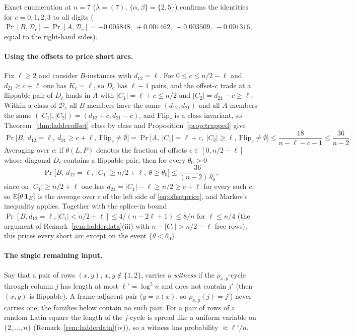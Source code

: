 Exact enumeration at $n=7$ ($\lambda=(7)$, $\{\alpha,\beta\}=\{2,5\}$)
confirms the identities for $c=0,1,2,3$ to all digits
($\Pr[B,\mathcal D_c]-\Pr[A,\mathcal D_c]=-0.005848,\ +0.001462,\
+0.003509,\ -0.001316$, equal to the right-hand sides).

\paragraph{Using the offsets to price short arcs.}  Fix $\ell\ge2$ and
consider $B$-instances with $d_{12}=\ell$.  For $0\le c\le n/2-\ell$
and $d_{21}\ge c+\ell$ one has $K_c=\ell$, so $D_c$ has $\ell-1$ pairs,
and the offset-$c$ trade at a flippable pair of $D_c$ lands in $A$
with $|C_1|=\ell+c\le n/2$ and $|C_2|=d_{21}-c\ge\ell$.  Within a
class of $\mathcal D_c$ all $B$-members have the same $(d_{12},d_{21})$
and all $A$-members the same $(|C_1|,|C_2|)=(d_{12}+c,d_{21}-c)$, and
$\mathrm{Flip}_c$ is a class invariant, so Theorem~\ref{thm:ladderoffset}
class by class and Proposition~\ref{prop:trapped} give
\begin{equation}\label{eq:offsetprice}
\Pr\bigl[B,\ d_{12}=\ell,\ d_{21}\ge c+\ell,\ \mathrm{Flip}_c\ne\emptyset\bigr]
=\Pr\bigl[A,\ |C_1|=\ell+c,\ |C_2|\ge\ell,\ \mathrm{Flip}_c\ne\emptyset\bigr]
\le\frac{18}{n-\ell-c-1}\le\frac{36}{n-2}.
\end{equation}
Averaging over $c$: if $\theta(L,P)$ denotes the fraction of offsets
$c\in[0,n/2-\ell]$ whose diagonal $D_c$ contains a flippable pair,
then for every $\theta_0>0$
\begin{equation}\label{eq:offsetavg}
\Pr\bigl[B,\ d_{12}=\ell,\ |C_1|\ge n/2+\ell,\ \theta\ge\theta_0\bigr]\le\frac{36}{(n-2)\,\theta_0},
\end{equation}
since on $|C_1|\ge n/2+\ell$ one has $d_{21}=|C_1|-\ell\ge n/2\ge c+\ell$
for every such $c$, so $\mathbb{E}[\theta\,\mathbf 1_E]$ is the average over
$c$ of the left side of \eqref{eq:offsetprice}, and Markov's
inequality applies.  Together with the splice-in bound
$\Pr[B,d_{12}=\ell,|C_1|<n/2+\ell]\le4/(n-2\ell+1)\le8/n$ for
$\ell\le n/4$ (the argument of Remark~\ref{rem:ladderdata}(iii) with
$n-|C_1|>n/2-\ell$ free rows), this prices every short arc except on
the event $\{\theta<\theta_0\}$.

\paragraph{The single remaining input.}  Say that a pair of rows
$(x,y)$, $x,y\notin\{1,2\}$, carries a \emph{witness} if the
$\rho_{x,y}$-cycle through column $j$ has length at most
$\ell'=\log^5n$ and does not contain $j'$ (then $(x,y)$ is flippable).
A frame-adjacent pair ($y=\pi(x)$, so $\rho_{x,y}(j)=j'$) never
carries one; the families below contain no such pair.
For a pair of rows of a random Latin square the length of the
$j$-cycle is spread like a uniform variable on $\{2,\dots,n\}$
(Remark~\ref{rem:ladderdata}(iv)), so a witness has probability
$\approx\ell'/n$.

